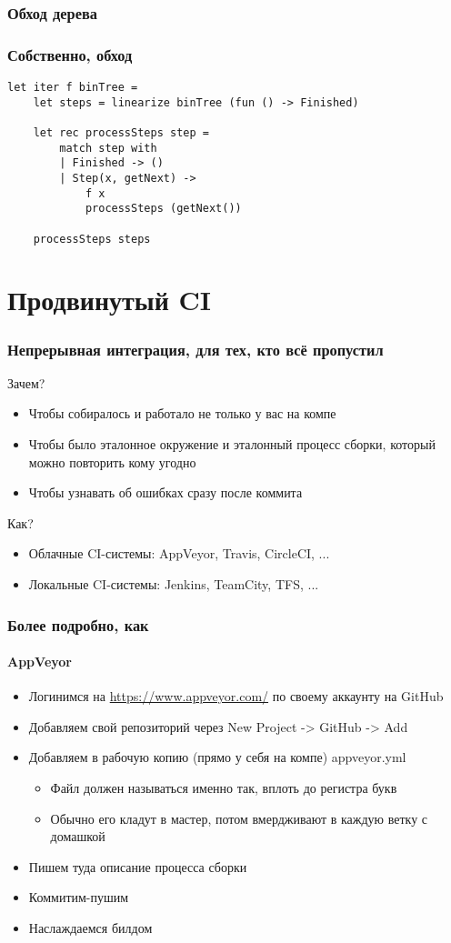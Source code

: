 \documentclass[xetex,mathserif,serif]{beamer}
\begin{document}
	\begin{frame}[fragile]
		\frametitle{Обход дерева}
		\frametitle{Собственно, обход}
		\begin{verbatim}
let iter f binTree =
    let steps = linearize binTree (fun () -> Finished)

    let rec processSteps step =
        match step with
        | Finished -> ()
        | Step(x, getNext) -> 
            f x
            processSteps (getNext())
    
    processSteps steps
		\end{verbatim}
	\end{frame}

	\section{Продвинутый CI}

	\begin{frame}
		\frametitle{Непрерывная интеграция, для тех, кто всё пропустил}
		Зачем?
		\begin{itemize}
			\item Чтобы собиралось и работало не только у вас на компе
			\item Чтобы было эталонное окружение и эталонный процесс сборки, который можно повторить кому угодно
			\item Чтобы узнавать об ошибках сразу после коммита
		\end{itemize}
		Как?
		\begin{itemize}
			\item Облачные CI-системы: AppVeyor, Travis, CircleCI, ...
			\item Локальные CI-системы: Jenkins, TeamCity, TFS, ...
		\end{itemize}
	\end{frame}

	\begin{frame}
		\frametitle{Более подробно, как}
		\framesubtitle{AppVeyor}
		\begin{itemize}
			\item Логинимся на \url{https://www.appveyor.com/} по своему аккаунту на GitHub
			\item Добавляем свой репозиторий через New Project -> GitHub -> Add
			\item Добавляем в рабочую копию (прямо у себя на компе) appveyor.yml
			\begin{itemize}
				\item Файл должен называться именно так, вплоть до регистра букв
				\item Обычно его кладут в мастер, потом вмердживают в каждую ветку с домашкой
			\end{itemize}
			\item Пишем туда описание процесса сборки
			\item Коммитим-пушим
			\item Наслаждаемся билдом
		\end{itemize}
	\end{frame}
\end{document}
